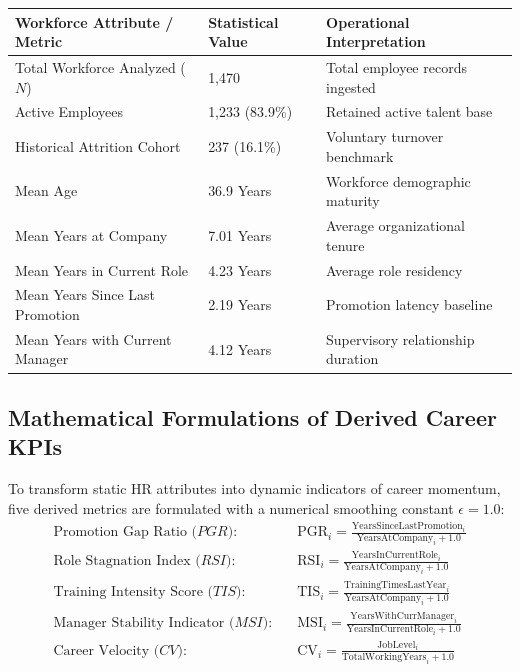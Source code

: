 \documentclass[12pt,a4paper,oneside]{article}
\begin{document}
\begin{center}
\fontsize{9}{11}\selectfont
\begin{tabular}{|L{4.6cm}|C{2.4cm}|L{7.0cm}|}
\hline
\textbf{Workforce Attribute / Metric} & \textbf{Statistical Value} & \textbf{Operational Interpretation} \\ \hline
Total Workforce Analyzed ($N$) & 1,470 & Total employee records ingested \\ \hline
Active Employees & 1,233 (83.9\%) & Retained active talent base \\ \hline
Historical Attrition Cohort & 237 (16.1\%) & Voluntary turnover benchmark \\ \hline
Mean Age & 36.9 Years & Workforce demographic maturity \\ \hline
Mean Years at Company & 7.01 Years & Average organizational tenure \\ \hline
Mean Years in Current Role & 4.23 Years & Average role residency \\ \hline
Mean Years Since Last Promotion & 2.19 Years & Promotion latency baseline \\ \hline
Mean Years with Current Manager & 4.12 Years & Supervisory relationship duration \\ \hline
\end{tabular}
\vspace{0.02in}
\label{tab:dataset_schema}
\end{center}

\subsection{Mathematical Formulations of Derived Career KPIs}
To transform static HR attributes into dynamic indicators of career momentum, five derived metrics are formulated with a numerical smoothing constant $\epsilon = 1.0$:
\begin{align}
\text{Promotion Gap Ratio ($PGR$):} & \quad \text{PGR}_i = \frac{\text{YearsSinceLastPromotion}_i}{\text{YearsAtCompany}_i + 1.0} \\
\text{Role Stagnation Index ($RSI$):} & \quad \text{RSI}_i = \frac{\text{YearsInCurrentRole}_i}{\text{YearsAtCompany}_i + 1.0} \\
\text{Training Intensity Score ($TIS$):} & \quad \text{TIS}_i = \frac{\text{TrainingTimesLastYear}_i}{\text{YearsAtCompany}_i + 1.0} \\
\text{Manager Stability Indicator ($MSI$):} & \quad \text{MSI}_i = \frac{\text{YearsWithCurrManager}_i}{\text{YearsInCurrentRole}_i + 1.0} \\
\text{Career Velocity ($CV$):} & \quad \text{CV}_i = \frac{\text{JobLevel}_i}{\text{TotalWorkingYears}_i + 1.0}
\end{align}
\end{document}
